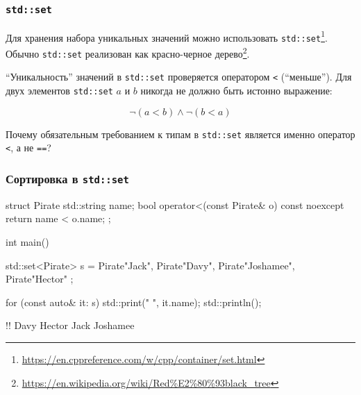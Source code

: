 \documentclass[compress, 8pt]{beamer}
\begin{document}
  \begin{frame}[fragile]

    \frametitle{\texttt{std::set}}

    Для хранения набора уникальных значений можно использовать
    \texttt{std::set}\footnote{\url{https://en.cppreference.com/w/cpp/container/set.html}}.
    Обычно \texttt{std::set} реализован как красно-черное
    дерево\footnote{\url{https://en.wikipedia.org/wiki/Red\%E2\%80\%93black\_tree}}.

    \hfill \break
    \enquote{Уникальность} значений в \texttt{std::set} проверяется оператором
    \texttt{<} (\enquote{меньше}).
    Для двух элементов \texttt{std::set} $a$ и $b$ никогда не должно быть
    истонно выражение:

    \begin{equation*}
      \neg \left(a < b\right) \land \neg \left(b < a\right)
    \end{equation*}

    \hfill \break
    \begin{task}
      Почему обязательным требованием к типам в \texttt{std::set} является
      именно оператор \texttt{<}, а не \texttt{==}?
    \end{task}

  \end{frame}

  \begin{frame}[fragile]

    \frametitle{Сортировка в \texttt{std::set}}

    \begin{mycppinplacelisting}
struct Pirate {
    std::string name;
    bool operator<(const Pirate& o) const noexcept {
        return name < o.name;
    }
};

int main() {
    std::set<Pirate> s = {
        Pirate{"Jack"}, Pirate{"Davy"},
        Pirate{"Joshamee"}, Pirate{"Hector"}
    };

    for (const auto& it: s) std::print("{} ", it.name);
    std::println();
}
    \end{mycppinplacelisting}

    \begin{terminalwindow}
!!
Davy Hector Jack Joshamee
    \end{terminalwindow}

  \end{frame}
\end{document}
